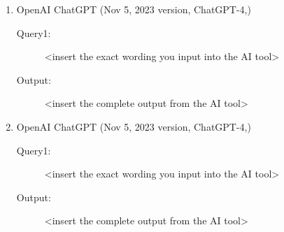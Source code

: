 \documentclass{mcmthesis}
\begin{document}
\begin{enumerate}
\item OpenAI ChatGPT (Nov 5, 2023 version, ChatGPT-4,) 
\begin{description}
	\item[Query1:] <insert the exact wording you input into the AI tool> 
	\item[Output:] <insert the complete output from the AI tool>
\end{description}
	
\item OpenAI ChatGPT (Nov 5, 2023 version, ChatGPT-4,) 
\begin{description}
	\item[Query1:] <insert the exact wording you input into the AI tool> 
	\item[Output:] <insert the complete output from the AI tool>
\end{description}

\end{enumerate}

\clearpage
\setcounter{page}{\value{lastpage}}
\end{document}
